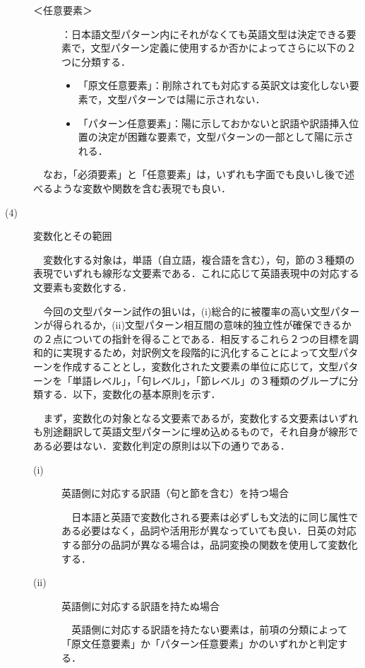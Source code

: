\documentclass{nlp}
\begin{document}
\begin{description}
\begin{description}
\item[＜任意要素＞]：日本語文型パターン内にそれがなくても英語文型は決定できる要素で，文型パターン定義に使用するか否かによってさらに以下の２つに分類する．

\begin{itemize}
\item 「原文任意要素」：削除されても対応する英訳文は変化しない要素で，文型パターンでは陽に示されない．
\item 「パターン任意要素」：陽に示しておかないと訳語や訳語挿入位置の決定が困難な要素で，文型パターンの一部として陽に示される．
\end{itemize}
\end{description}

　なお，「必須要素」と「任意要素」は，いずれも字面でも良いし後で述べるような変数や関数を含む表現でも良い．

\item[(4)] 変数化とその範囲 

\verb|  |変数化する対象は，単語（自立語，複合語を含む），句，節の３種類の表現でいずれも線形な文要素である．これに応じて英語表現中の対応する文要素も変数化する．

\verb|  |今回の文型パターン試作の狙いは，(i)総合的に被覆率の高い文型パターンが得られるか，(ii)文型パターン相互間の意味的独立性が確保できるかの２点についての指針を得ることである．相反するこれら２つの目標を調和的に実現するため，対訳例文を段階的に汎化することによって文型パターンを作成することとし，変数化された文要素の単位に応じて，文型パターンを「単語レベル」，「句レベル」，「節レベル」の３種類のグループに分類する．以下，変数化の基本原則を示す．

\verb|  |まず，変数化の対象となる文要素であるが，変数化する文要素はいずれも別途翻訳して英語文型パターンに埋め込めるもので，それ自身が線形である必要はない．変数化判定の原則は以下の通りである．

\begin{description}
\item[(i)] 英語側に対応する訳語（句と節を含む）を持つ場合 

\verb|  |日本語と英語で変数化される要素は必ずしも文法的に同じ属性である必要はなく，品詞や活用形が異なっていても良い．日英の対応する部分の品詞が異なる場合は，品詞変換の関数を使用して変数化する．

\item[(ii)] 英語側に対応する訳語を持たぬ場合 

\verb|  |英語側に対応する訳語を持たない要素は，前項の分類によって「原文任意要素」か「パターン任意要素」かのいずれかと判定する．


\end{description}
\end{description}
\end{document}
